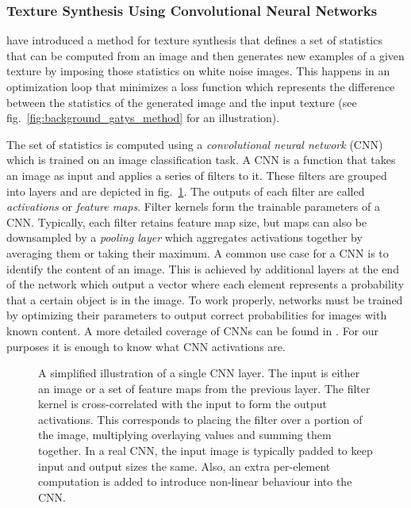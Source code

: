 \subsubsection{Texture Synthesis Using Convolutional Neural Networks}
\label{section:background-texture_synthesis-statistics_based-synthesis_using_cnns}

\citet{Gatys2015} have introduced a method for texture synthesis that defines a set of statistics that can be computed from an image and then generates new examples of a given texture by imposing those statistics on white noise images. This happens in an optimization loop that minimizes a loss function which represents the difference between the statistics of the generated image and the input texture (see fig.~\ref{fig:background_gatys_method} for an illustration).

The set of statistics is computed using a \textit{convolutional neural network} (CNN) which is trained on an image classification task. A CNN is a function that takes an image as input and applies a series of filters to it. These filters are grouped into layers and are depicted in fig.~\ref{fig:background_cnn}. The outputs of each filter are called \textit{activations} or \textit{feature maps}. Filter kernels form the trainable parameters of a CNN. Typically, each filter retains feature map size, but maps can also be downsampled by a \textit{pooling layer} which aggregates activations together by averaging them or taking their maximum. A common use case for a CNN is to identify the content of an image. This is achieved by additional layers at the end of the network which output a vector where each element represents a probability that a certain object is in the image. To work properly, networks must be trained by optimizing their parameters to output correct probabilities for images with known content. A more detailed coverage of CNNs can be found in \citet{Goodfellow2016}. For our purposes it is enough to know what CNN activations are.

\begin{figure}
    \centering
    \def\svgwidth{0.6\textwidth}
    
    \caption{A simplified illustration of a single CNN layer. The input is either an image or a set of feature maps from the previous layer. The filter kernel is cross-correlated with the input to form the output activations. This corresponds to placing the filter over a portion of the image, multiplying overlaying values and summing them together. In a real CNN, the input image is typically padded to keep input and output sizes the same. Also, an extra per-element computation is added to introduce non-linear behaviour into the CNN.}
    \label{fig:background_cnn}
\end{figure}

